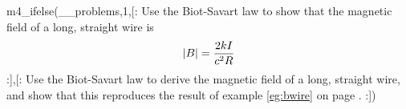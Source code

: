 m4_ifelse(__problems,1,[:%
        Use the Biot-Savart law to show that the magnetic field of a long, straight wire
        is 
        \begin{equation*}
                | B| = \frac{2 kI}{ c^2 R}\\
        \end{equation*}
:],[:%
        Use the Biot-Savart law to derive the magnetic field of a long, straight wire,
        and show that this reproduces the result of example \ref{eg:bwire} on page \pageref{eg:bwire}.
:])
